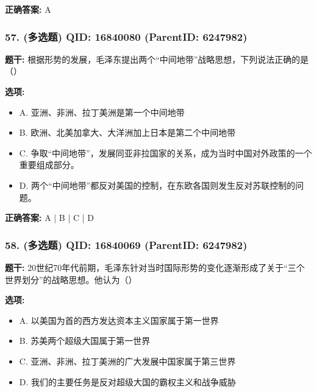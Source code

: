 \documentclass[12pt,UTF8]{ctexart}
\begin{document}
\textbf{正确答案:}
A

\vspace{0.3em}\hrulefill\vspace{0.7em}

\subsubsection*{57. (多选题) \small QID: 16840080 (ParentID: 6247982)}

\textbf{题干:}
根据形势的发展，毛泽东提出两个“中间地带”战略思想，下列说法正确的是（）



\textbf{选项:}
\begin{itemize}[leftmargin=*]

  \item A. 亚洲、非洲、拉丁美洲是第一个中间地带

  \item B. 欧洲、北美加拿大、大洋洲加上日本是第二个中间地带

  \item C. 争取“中间地带”，发展同亚非拉国家的关系，成为当时中国对外政策的一个重要组成部分。

  \item D. 两个“中间地带”都反对美国的控制，在东欧各国则发生反对苏联控制的问题。

\end{itemize}

\textbf{正确答案:}
A | B | C | D

\vspace{0.3em}\hrulefill\vspace{0.7em}

\subsubsection*{58. (多选题) \small QID: 16840069 (ParentID: 6247982)}

\textbf{题干:}
20世纪70年代前期，毛泽东针对当时国际形势的变化逐渐形成了关于“三个世界划分”的战略思想。他认为（）



\textbf{选项:}
\begin{itemize}[leftmargin=*]

  \item A. 以美国为首的西方发达资本主义国家属于第一世界

  \item B. 苏美两个超级大国属于第一世界

  \item C. 亚洲、非洲、拉丁美洲的广大发展中国家属于第三世界

  \item D. 我们的主要任务是反对超级大国的霸权主义和战争威胁

\end{itemize}
\end{document}
